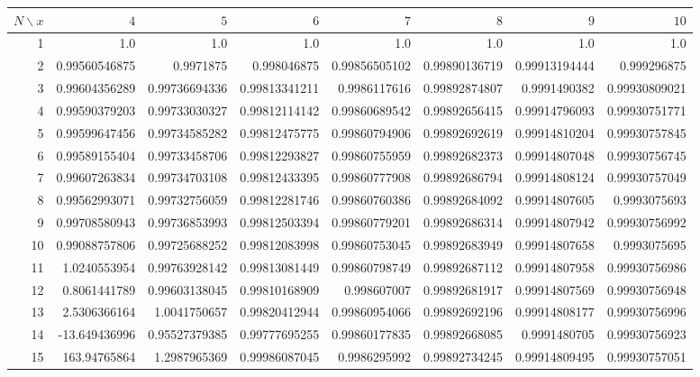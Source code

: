 \begin{center}\begingroup\scriptsize\setlength{\tabcolsep}{1.5pt}
\begin{tabular}{r r r r r r r r}
\toprule
$N\backslash x$ & $4$ & $5$ & $6$ & $7$ & $8$ & $9$ & $10$\\
\midrule
1 & 1.0 & 1.0 & 1.0 & 1.0 & 1.0 & 1.0 & 1.0 \\
2 & 0.99560546875 & 0.9971875 & 0.998046875 & 0.99856505102 & 0.99890136719 & 0.99913194444 & 0.999296875 \\
3 & 0.99604356289 & 0.99736694336 & 0.99813341211 & 0.9986117616 & 0.99892874807 & 0.9991490382 & 0.99930809021 \\
4 & 0.99590379203 & 0.99733030327 & 0.99812114142 & 0.99860689542 & 0.99892656415 & 0.99914796093 & 0.99930751771 \\
5 & 0.99599647456 & 0.99734585282 & 0.99812475775 & 0.99860794906 & 0.99892692619 & 0.99914810204 & 0.99930757845 \\
6 & 0.99589155404 & 0.99733458706 & 0.99812293827 & 0.99860755959 & 0.99892682373 & 0.99914807048 & 0.99930756745 \\
7 & 0.99607263834 & 0.99734703108 & 0.99812433395 & 0.99860777908 & 0.99892686794 & 0.99914808124 & 0.99930757049 \\
8 & 0.99562993071 & 0.99732756059 & 0.99812281746 & 0.99860760386 & 0.99892684092 & 0.99914807605 & 0.9993075693 \\
9 & 0.99708580943 & 0.99736853993 & 0.99812503394 & 0.99860779201 & 0.99892686314 & 0.99914807942 & 0.99930756992 \\
10 & 0.99088757806 & 0.99725688252 & 0.99812083998 & 0.99860753045 & 0.99892683949 & 0.99914807658 & 0.9993075695 \\
11 & 1.0240553954 & 0.99763928142 & 0.99813081449 & 0.99860798749 & 0.99892687112 & 0.99914807958 & 0.99930756986 \\
12 & 0.8061441789 & 0.99603138045 & 0.99810168909 & 0.998607007 & 0.99892681917 & 0.99914807569 & 0.99930756948 \\
13 & 2.5306366164 & 1.0041750657 & 0.99820412944 & 0.99860954066 & 0.99892692196 & 0.99914808177 & 0.99930756996 \\
14 & -13.649436996 & 0.95527379385 & 0.99777695255 & 0.99860177835 & 0.99892668085 & 0.9991480705 & 0.99930756923 \\
15 & 163.94765864 & 1.2987965369 & 0.99986087045 & 0.9986295992 & 0.99892734245 & 0.99914809495 & 0.99930757051 \\
\bottomrule
\end{tabular}\endgroup\end{center}
